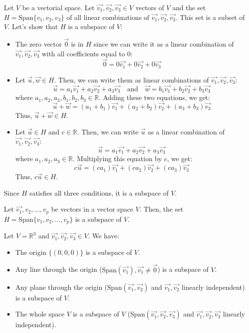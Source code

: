 \begin{eg}
    Let $V$ be a vectorial space. Let $\vec{v_1}, \vec{v_2}, \vec{v_3} \in V$ vectors of $V$ and the set $H = \text{Span}\{v_1,v_2,v_3\}$ of all linear combinations of $\vec{v_1}, \vec{v_2}, \vec{v_3}$. This set is a subset of $V$. Let's show that $H$ is a subspace of $V$:
    \begin{itemize}[itemsep=1pt,label=$\circ$]
        \item The zero vector $\vec{0}$ is in $H$ since we can write it as a linear combination of $\vec{v_1}, \vec{v_2}, \vec{v_3}$ with all coefficients equal to $0$:
        \[ \vec{0} = 0\vec{v_1} + 0\vec{v_2} + 0\vec{v_3} \]
        \item Let $\vec{u}, \vec{w} \in H$. Then, we can write them as linear combinations of $\vec{v_1}, \vec{v_2}, \vec{v_3}$:
        \[ \vec{u} = a_1\vec{v_1} + a_2\vec{v_2} + a_3\vec{v_3} \quad \text{and} \quad \vec{w} = b_1\vec{v_1} + b_2\vec{v_2} + b_3\vec{v_3} \]
        where $a_1, a_2, a_3, b_1, b_2, b_3 \in \mathbb{R}$. Adding these two equations, we get:
        \[ \vec{u} + \vec{w} = (a_1 + b_1)\vec{v_1} + (a_2 + b_2)\vec{v_2} + (a_3 + b_3)\vec{v_3} \]
        Thus, $\vec{u} + \vec{w} \in H$.
        \item Let $\vec{u} \in H$ and $c \in \mathbb{R}$. Then, we can write $\vec{u}$ as a linear combination of $\vec{v_1}, \vec{v_2}, \vec{v_3}$:
        \[ \vec{u} = a_1\vec{v_1} + a_2\vec{v_2} + a_3\vec{v_3} \]
        where $a_1, a_2, a_3 \in \mathbb{R}$. Multiplying this equation by $c$, we get:
        \[ c\vec{u} = (ca_1)\vec{v_1} + (ca_2)\vec{v_2} + (ca_3)\vec{v_3} \]
        Thus, $c\vec{u} \in H$.
    \end{itemize}
    Since $H$ satisfies all three conditions, it is a subspace of $V$.
\end{eg}

\begin{theorem}
    Let $\vec{v_1}, v_2, \ldots, v_p$ be vectors in a vector space $V$. Then, the set $H = \text{Span}\{v_1, v_2, \ldots, v_p\}$ is a subspace of $V$.
\end{theorem}

\begin{eg}
    Let $V = \mathbb{R}^3$ and $\vec{v_1}, \vec{v_2}, \vec{v_3} \in V$. We have:
    \begin{itemize}[itemsep=1pt,label=$\circ$]
        \item The origin $\{(0,0,0)\}$ is a subspace of $V$.
        \item Any line through the origin ($\text{Span}(\vec{v_1}), \vec{v_1} \neq \vec{0}$) is a subspace of $V$.
        \item Any plane through the origin ($\text{Span}(\vec{v_1}, \vec{v_2})$ and $\vec{v_1}, \vec{v_2}$ linearly independent) is a subspace of $V$.
        \item The whole space $V$ is a subspace of $V$ ($\text{Span}(\vec{v_1}, \vec{v_2}, \vec{v_3})$ and $\vec{v_1}, \vec{v_2}, \vec{v_3}$ linearly independent).
    \end{itemize}
\end{eg}


